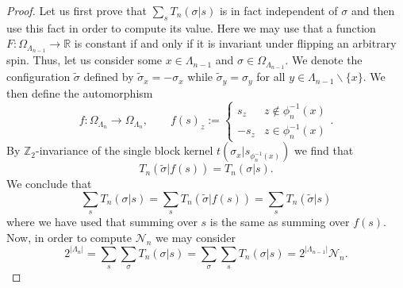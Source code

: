 \documentclass{article}
\begin{document}
\begin{proof}
    Let us first prove that $\sum_sT_n(\sigma|s)$ is in fact independent of $\sigma$ and then use this fact in order to compute its value. Here we may use that a function $F:\Omega_{\Lambda_{n-1}}\to\mathds{R}$ is constant if and only if it is invariant under flipping an arbitrary spin. Thus, let us consider some $x\in\Lambda_{n-1}$ and $\sigma\in\Omega_{\Lambda_{n-1}}$. We denote the configuration $\tilde\sigma$ defined by $\tilde\sigma_x=-\sigma_x$ while $\tilde\sigma_y=\sigma_y$ for all $y\in\Lambda_{n-1}\backslash\{x\}$. We then define the automorphism
    \begin{equation}
        f:\Omega_{\Lambda_n}\to\Omega_{\Lambda_n},\qquad f(s)_z:=\begin{cases}
            s_z&z\notin\phi_n^{-1}(x)\\
            -s_z&z\in\phi_n^{-1}(x)
        \end{cases}.
    \end{equation}
    By $\mathds{Z}_2$-invariance of the single block kernel $t(\sigma_x|s_{\phi_n^{-1}(x)})$ we find that
    \begin{equation}
        T_n(\tilde\sigma|f(s))=T_n(\sigma|s).
    \end{equation}
    We conclude that
    \begin{equation}
        \sum_sT_n(\sigma|s)=\sum_sT_n(\tilde\sigma|f(s))=\sum_sT_n(\tilde\sigma|s)
    \end{equation}
    where we have used that summing over $s$ is the same as summing over $f(s)$. Now, in order to compute $\mathcal{N}_n$ we may consider
    \begin{equation}
        2^{|\Lambda_n|}=\sum_s\sum_\sigma T_n(\sigma|s)=\sum_\sigma\sum_sT_n(\sigma|s)=2^{|\Lambda_{n-1}|}\mathcal{N}_n.
    \end{equation}
\end{proof}
\end{document}
